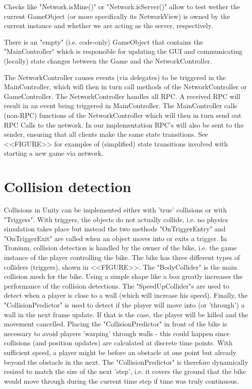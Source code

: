 \documentclass{report}
\begin{document}
Checks like "Network.isMine()" or "Network.isServer()" allow to test wether the current GameObject (or more specifically its NetworkView) is owned by the current instance and whether we are acting as the server, respectively. 

There is an "empty" (i.e. code-only) GameObject that contains the "MainController" which is responsible for updating the GUI and communicating (locally) state changes between the Game and the NetworkController.

The NetworkController causes events (via delegates) to be triggered in the MainController, which will then in turn call methods of the NetworkController or GameController.
The NetworkController handles all RPC. A received RPC will result in an event being triggered in MainController.
The MainController calls (non-RPC) functions of the NetworkController which will then in turn send out RPC Calls  to the network.
In our implementation RPC's will also be sent to the sender, ensuring that all clients make the same state transitions.
See <<FIGURE>> for examples of (simplified) state transitions involved with starting a new game via network.



\section{Collision detection}
Collisions in Unity can be implemented either with 'true' collisions or with "Triggers". With triggers, the objects do not actually collide, i.e. no physics simulation takes place but instead the two methods "OnTriggerEntry" and "OnTriggerExit" are called when an object moves into or exits a trigger. 
In Tronium, collision detection is handled by the owner of the bike, i.e. the game instance of the player controlling the bike.
The bike has three different types of colliders (triggers), shown in <<FIGURE>>. 
The "BodyCollider" is the main collision mesh for the bike.
Using a simple shape like a box greatly increases the performance of the collision detections.
The "SpeedUpCollider"s are used to detect when a player is close to a wall (which will increase his speed). 
Finally, the "CollisionPredictor" is used to detect if the player will move into (or 'through') a wall in the next frame update. If that is the case, the player will be killed and the movement cancelled. 
Placing the "CollisionPredictor" in front of the bike is necessary to avoid players 'warping' through walls  - this could happen since collisions (and position updates) are calculated at discrete time points. With sufficient speed, a player might be before an obstacle at one point but already beyond the obstacle in the next.
The "CollisionPredictor" is therefore dynamically resized to match the size of the next 'step', i.e. it covers the ground that the bike would move through during the current time step if time was truly continuous. 
\end{document}
